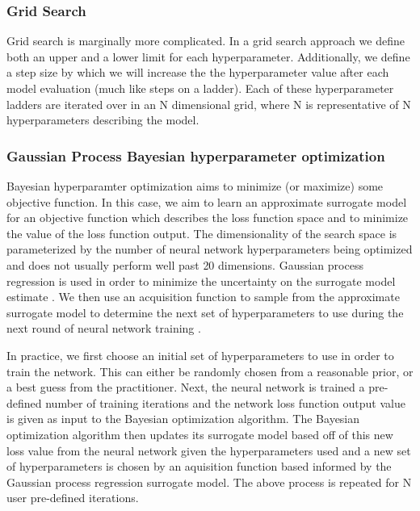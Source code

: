 \subsubsection{Grid Search}

Grid search is marginally more complicated. In a grid 
search approach we define both an upper and a lower limit 
for each hyperparameter. Additionally, we define a step 
size by which we will increase the the hyperparameter 
value after each model evaluation (much like steps 
on a ladder). Each of these hyperparameter 
ladders are iterated over in an N dimensional grid, 
where N is representative of N hyperparameters 
describing the model. 

\subsubsection{Gaussian Process Bayesian hyperparameter optimization}

Bayesian hyperparamter optimization aims to minimize (or maximize) some 
objective function. In this case, we aim to learn an 
approximate surrogate model for an objective function which 
describes the loss function space and to minimize the value of the 
loss function output. The dimensionality of the search space 
is parameterized by the number of neural network hyperparameters being optimized 
and does not usually perform well past 20 dimensions. Gaussian process 
regression is used in order to minimize the uncertainty on the surrogate model estimate 
. We then use an acquisition function to sample from the approximate 
surrogate model to determine the next set of hyperparameters to use 
during the next round of neural network training \cite{1807.02811}.

In practice, we first choose an initial set of hyperparameters 
to use in order to train the network. This can either be randomly chosen 
from a reasonable prior, or a best guess from the practitioner. 
Next, the neural network is trained a pre-defined number of 
training iterations and the network loss function output value 
is given as input to the Bayesian optimization algorithm. The Bayesian 
optimization algorithm then updates its surrogate model 
based off of this new loss value from the neural network 
given the hyperparameters used and a new set of 
hyperparameters is chosen by an aquisition function based 
informed by the Gaussian process regression surrogate model. 
The above process is repeated for N user pre-defined iterations.
%

